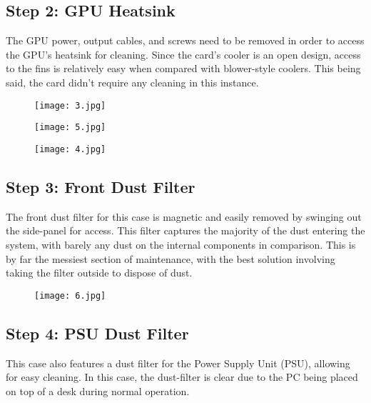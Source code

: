 \documentclass[11pt]{amsart}
\begin{document}
\hypertarget{x-step-2:-gpu-heatsink}{\subsection*{Step 2: GPU Heatsink}}
The GPU power, output cables, and screws need to be removed in order to access the GPU’s heatsink for cleaning. Since the card’s cooler is an open design, access to the fins is relatively easy when compared with blower-style coolers. This being said, the card didn’t require any cleaning in this instance.


\begin{figure}[h]{}
\centering\texttt{[image: 3.jpg]}
\caption{}

\end{figure}

\begin{figure}[h]{}
\centering\texttt{[image: 5.jpg]}
\caption{}

\end{figure}

\begin{figure}[h]{}
\centering\texttt{[image: 4.jpg]}
\caption{}

\end{figure}

\hypertarget{x-step-3:-front-dust-filter}{\subsection*{Step 3: Front Dust Filter}}
The front dust filter for this case is magnetic and easily removed by swinging out the side-panel for access. This filter captures the majority of the dust entering the system, with barely any dust on the internal components in comparison. This is by far the messiest section of maintenance, with the best solution involving taking the filter outside to dispose of dust.


\begin{figure}[h]{}
\centering\texttt{[image: 6.jpg]}
\caption{}

\end{figure}

\hypertarget{x-step-4:-psu-dust-filter}{\subsection*{Step 4: PSU Dust Filter}}
This case also features a dust filter for the Power Supply Unit (PSU), allowing for easy cleaning. In this case, the dust-filter is clear due to the PC being placed on top of a desk during normal operation.
\end{document}
